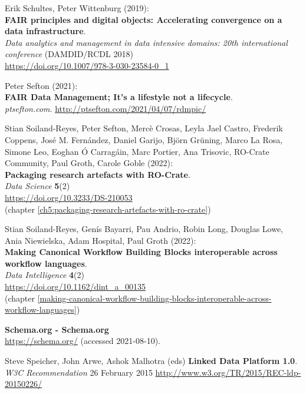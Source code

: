 \begin{thebibliography}{9}
Erik Schultes, Peter Wittenburg (2019):\\
\textbf{FAIR principles and digital objects: Accelerating convergence on
a data infrastructure}.\\
\emph{Data analytics and management in data intensive domains: 20th
international conference} (DAMDID/RCDL 2018)\\
\url{https://doi.org/10.1007/978-3-030-23584-0_1}

Peter Sefton (2021):\\
\textbf{FAIR Data Management; It's a lifestyle not a lifecycle}.\\
\emph{ptsefton.com}. \url{http://ptsefton.com/2021/04/07/rdmpic/}

Stian Soiland-Reyes, Peter Sefton, Mercè
Crosas, Leyla Jael Castro, Frederik Coppens, José M. Fernández, Daniel
Garijo, Björn Grüning, Marco La Rosa, Simone Leo, Eoghan Ó Carragáin,
Marc Portier, Ana Trisovic, RO-Crate Community, Paul Groth, Carole Goble
(2022):\\
\textbf{Packaging research artefacts with RO-Crate}.\\
\emph{Data Science} \textbf{5}(2)\\
\url{https://doi.org/10.3233/DS-210053}\\
(chapter \vref{ch5:packaging-research-artefacts-with-ro-crate})

Stian Soiland-Reyes, Genís Bayarri, Pau
Andrio, Robin Long, Douglas Lowe, Ania Niewielska, Adam Hospital, Paul
Groth (2022):\\
\textbf{Making Canonical
Workflow Building Blocks interoperable across workflow languages}.\\
\emph{Data Intelligence} \textbf{4}(2)\\
\url{https://doi.org/10.1162/dint_a_00135}\\
(chapter \vref{making-canonical-workflow-building-blocks-interoperable-across-workflow-languages})


\textbf{Schema.org - Schema.org}\\
\url{https://schema.org/} (accessed 2021-08-10).

Steve Speicher, John Arwe,  Ashok Malhotra (eds)
\textbf{Linked Data Platform 1.0}. 
\emph{W3C Recommendation} 26 February 2015
\url{http://www.w3.org/TR/2015/REC-ldp-20150226/}


\end{thebibliography}
